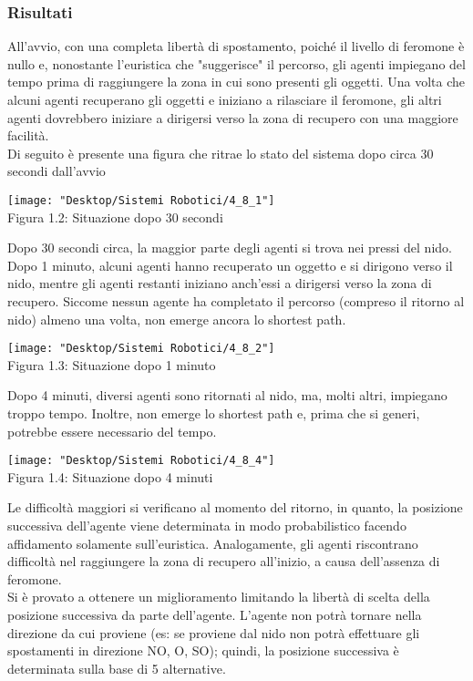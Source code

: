 \documentclass[12pt,a4paper,openright,twoside]{report}
\begin{document}
\subsubsection{Risultati}

All'avvio, con una completa libertà di spostamento, poiché il livello di feromone è nullo e, nonostante l'euristica che "suggerisce" il percorso, gli agenti impiegano del tempo prima di raggiungere la zona in cui sono presenti gli oggetti. Una volta che alcuni agenti recuperano gli oggetti e iniziano a rilasciare il feromone, gli altri agenti dovrebbero iniziare a dirigersi verso la zona di recupero con una maggiore facilità.\\
Di seguito è presente una figura che ritrae lo stato del sistema dopo circa 30 secondi dall'avvio

\begin{center}  
	\texttt{[image: "Desktop/Sistemi Robotici/4\_8\_1"]}
	\\Figura 1.2: Situazione dopo 30 secondi
\end{center}

Dopo 30 secondi circa, la maggior parte degli agenti si trova nei pressi del nido. Dopo 1 minuto, alcuni agenti hanno recuperato un oggetto e si dirigono verso il nido, mentre gli agenti restanti iniziano anch'essi a dirigersi verso la zona di recupero. Siccome nessun agente ha completato il percorso (compreso il ritorno al nido) almeno una volta, non emerge ancora lo shortest path.

\begin{center}  
	\texttt{[image: "Desktop/Sistemi Robotici/4\_8\_2"]}
	\\Figura 1.3: Situazione dopo 1 minuto
\end{center}

Dopo 4 minuti, diversi agenti sono ritornati al nido, ma, molti altri, impiegano troppo tempo. Inoltre, non emerge lo shortest path e, prima che si generi, potrebbe essere necessario del tempo.

\begin{center}  
	\texttt{[image: "Desktop/Sistemi Robotici/4\_8\_4"]}
	\\Figura 1.4: Situazione dopo 4 minuti
\end{center}

Le difficoltà maggiori si verificano al momento del ritorno, in quanto, la posizione successiva dell'agente viene determinata in modo probabilistico facendo affidamento solamente sull'euristica. Analogamente, gli agenti riscontrano difficoltà nel raggiungere la zona di recupero all'inizio, a causa dell'assenza di feromone.\\
Si è provato a ottenere un miglioramento limitando la libertà di scelta della posizione successiva da parte dell'agente. L'agente non potrà tornare nella direzione da cui proviene (es: se proviene dal nido non potrà effettuare gli spostamenti in direzione NO, O, SO); quindi, la posizione successiva è determinata sulla base di 5 alternative.\\
\end{document}
